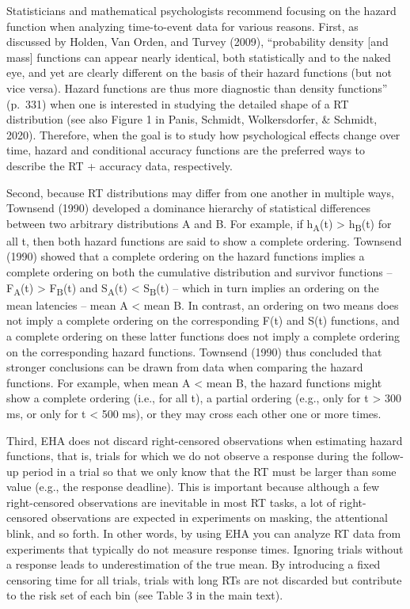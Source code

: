 \documentclass[
  english,
  man,floatsintext]{apa6}
\begin{document}
Statisticians and mathematical psychologists recommend focusing on the hazard function when analyzing time-to-event data for various reasons. First, as discussed by Holden, Van Orden, and Turvey (2009), ``probability density {[}and mass{]} functions can appear nearly identical, both statistically and to the naked eye, and yet are clearly different on the basis of their hazard functions (but not vice versa). Hazard functions are thus more diagnostic than density functions'' (p.~331) when one is interested in studying the detailed shape of a RT distribution (see also Figure 1 in Panis, Schmidt, Wolkersdorfer, \& Schmidt, 2020). Therefore, when the goal is to study how psychological effects change over time, hazard and conditional accuracy functions are the preferred ways to describe the RT + accuracy data, respectively.

Second, because RT distributions may differ from one another in multiple ways, Townsend (1990) developed a dominance hierarchy of statistical differences between two arbitrary distributions A and B. For example, if h\textsubscript{A}(t) \textgreater{} h\textsubscript{B}(t) for all t, then both hazard functions are said to show a complete ordering. Townsend (1990) showed that a complete ordering on the hazard functions implies a complete ordering on both the cumulative distribution and survivor functions -- F\textsubscript{A}(t) \textgreater{} F\textsubscript{B}(t) and S\textsubscript{A}(t) \textless{} S\textsubscript{B}(t) -- which in turn implies an ordering on the mean latencies -- mean A \textless{} mean B. In contrast, an ordering on two means does not imply a complete ordering on the corresponding F(t) and S(t) functions, and a complete ordering on these latter functions does not imply a complete ordering on the corresponding hazard functions. Townsend (1990) thus concluded that stronger conclusions can be drawn from data when comparing the hazard functions. For example, when mean A \textless{} mean B, the hazard functions might show a complete ordering (i.e., for all t), a partial ordering (e.g., only for t \textgreater{} 300 ms, or only for t \textless{} 500 ms), or they may cross each other one or more times.

Third, EHA does not discard right-censored observations when estimating hazard functions, that is, trials for which we do not observe a response during the follow-up period in a trial so that we only know that the RT must be larger than some value (e.g., the response deadline). This is important because although a few right-censored observations are inevitable in most RT tasks, a lot of right-censored observations are expected in experiments on masking, the attentional blink, and so forth. In other words, by using EHA you can analyze RT data from experiments that typically do not measure response times. Ignoring trials without a response leads to underestimation of the true mean. By introducing a fixed censoring time for all trials, trials with long RTs are not discarded but contribute to the risk set of each bin (see Table 3 in the main text).
\end{document}
